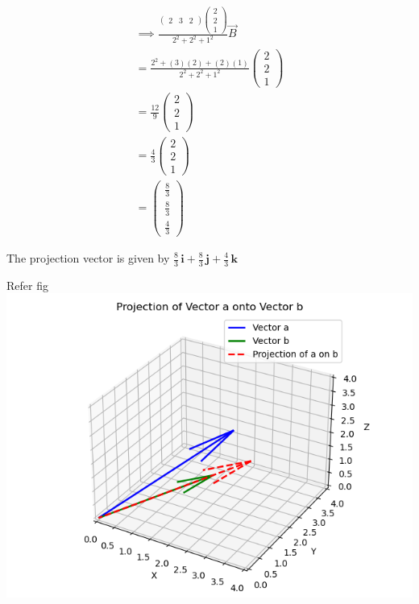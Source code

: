 \documentclass[journal]{IEEEtran}
\begin{document}
 \begin{align}
 \implies
\frac{\begin{pmatrix} 2 & 3 & 2 \end{pmatrix}\begin{pmatrix}
    2 \\ 2 \\ 1 \end{pmatrix}}{2^2+2^2+1^2}\vec{B}\\
=\frac{2^2+(3)(2)+(2)(1)}{2^2+2^2+1^2}\begin{pmatrix} 2 \\ 2 \\1 \end{pmatrix}\\
=\frac{12}{9}\begin{pmatrix} 2 \\ 2 \\1 \end{pmatrix}\\ 
=\frac{4}{3}\begin{pmatrix} 2 \\ 2 \\1 \end{pmatrix}\\ 
=\begin{pmatrix}
    \frac{8}{3} \\ \frac{8}{3}  \\    \frac{4}{3}
    \end{pmatrix}
\end{align}

The projection vector is given by $\frac{{8}}{3}\,\mathbf{i} + \frac{8}{3}\,\mathbf{j}+ 
\frac{4}{3}\,\mathbf{k}$


Refer fig
\centering
    \includegraphics[width=\columnwidth, height=0.8\textheight, keepaspectratio]{figs/Figure_3.png}     
\end{document}
